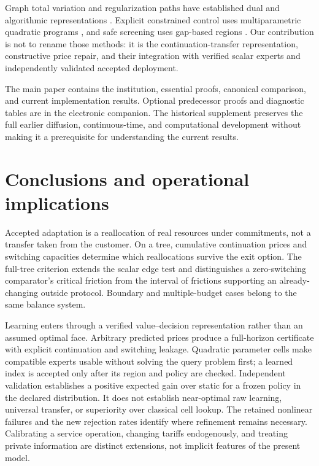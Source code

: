 \documentclass[11pt,letterpaper]{article}
\theoremstyle{definition}
\newcommand{\1}{\mathbf 1}
\begin{document}
Graph total variation and regularization paths have established dual and algorithmic representations \citep{TibshiraniTaylor2011,ArnoldTibshirani2016}. Explicit constrained control uses multiparametric quadratic programs \citep{Bemporad2002}, and safe screening uses gap-based regions \citep{Fercoq2015}. Our contribution is not to rename those methods: it is the continuation-transfer representation, constructive price repair, and their integration with verified scalar experts and independently validated accepted deployment.

The main paper contains the institution, essential proofs, canonical comparison, and current implementation results. Optional predecessor proofs and diagnostic tables are in the electronic companion. The historical supplement preserves the full earlier diffusion, continuous-time, and computational development without making it a prerequisite for understanding the current results.









\section{Conclusions and operational implications}
Accepted adaptation is a reallocation of real resources under commitments, not a transfer taken from the customer. On a tree, cumulative continuation prices and switching capacities determine which reallocations survive the exit option. The full-tree criterion extends the scalar edge test and distinguishes a zero-switching comparator's critical friction from the interval of frictions supporting an already-changing outside protocol. Boundary and multiple-budget cases belong to the same balance system.

Learning enters through a verified value--decision representation rather than an assumed optimal face. Arbitrary predicted prices produce a full-horizon certificate with explicit continuation and switching leakage. Quadratic parameter cells make compatible experts usable without solving the query problem first; a learned index is accepted only after its region and policy are checked. Independent validation establishes a positive expected gain over static for a frozen policy in the declared distribution. It does not establish near-optimal raw learning, universal transfer, or superiority over classical cell lookup. The retained nonlinear failures and the new rejection rates identify where refinement remains necessary. Calibrating a service operation, changing tariffs endogenously, and treating private information are distinct extensions, not implicit features of the present model.
\appendix

\end{document}
